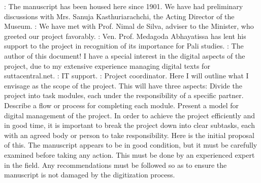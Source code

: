 : The manuscript has been housed here since 1901. We have had preliminary discussions with Mrs. Sanuja Kasthuriarachchi, the Acting Director of the Museum.\markdownRendererOlItemEnd 
{}: We have met with Prof. Nimal de Silva, adviser to the Minister, who greeted our project favorably.\markdownRendererOlItemEnd 
{}: Ven. Prof. Medagoda Abhayatissa has lent his support to the project in recognition of its importance for Pali studies.\markdownRendererOlItemEnd 
{}: The author of this document! I have a special interest in the digital aspects of the project, due to my extensive experience managing digital texts for suttacentral.net.\markdownRendererOlItemEnd 
{}: IT support.\markdownRendererOlItemEnd 
{}: Project coordinator.\markdownRendererOlItemEnd 
\markdownRendererOlEnd \markdownRendererInterblockSeparator
{}\markdownRendererInterblockSeparator
{}Here I will outline what I envisage as the scope of the project. This will have three aspects:\markdownRendererInterblockSeparator
{}\markdownRendererOlBegin
{}Divide the project into task modules, each under the responsibility of a specific partner.\markdownRendererOlItemEnd 
{}Describe a flow or process for completing each module.\markdownRendererOlItemEnd 
{}Present a model for digital management of the project.\markdownRendererOlItemEnd 
\markdownRendererOlEnd \markdownRendererInterblockSeparator
{}\markdownRendererInterblockSeparator
{}In order to achieve the project efficiently and in good time, it is important to break the project down into clear subtasks, each with an agreed body or person to take responsibility. Here is the initial proposal of this.\markdownRendererInterblockSeparator
{}\markdownRendererInterblockSeparator
{}The manuscript appears to be in good condition, but it must be carefully examined before taking any action. This must be done by an experienced expert in the field. Any recommendations must be followed so as to ensure the manuscript is not damaged by the digitization process.\markdownRendererInterblockSeparator
